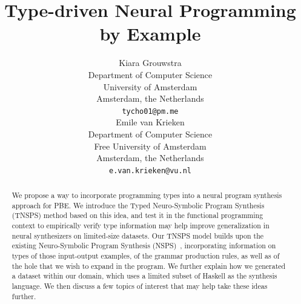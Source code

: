 \documentclass{article} %
\title{Type-driven Neural Programming by Example}
\author{
   Kiara Grouwstra
   \\
   Department of Computer Science \\
   University of Amsterdam\\
   Amsterdam, the Netherlands \\
   \texttt{tycho01@pm.me} \\
   \And
   Emile van Krieken \\
   Department of Computer Science \\
   Free University of Amsterdam\\
   Amsterdam, the Netherlands \\
   \texttt{e.van.krieken@vu.nl} \\
}
\begin{document}
% 


\maketitle






\begin{abstract}


   We propose a way to incorporate programming types into a neural program synthesis approach for PBE.
   We introduce the Typed Neuro-Symbolic Program Synthesis (TNSPS) method based on this idea,
   and test it in the functional programming context to empirically verify type information
   may help improve generalization in neural synthesizers on limited-size datasets.
   Our TNSPS model builds upon the existing Neuro-Symbolic Program Synthesis (NSPS)~\citep{nsps},
   incorporating information on types of those input-output examples,
   of the grammar production rules, as well as of the hole that we wish to expand in the program.
   We further explain how we generated a dataset within our domain,
   which uses a limited subset of Haskell as the synthesis language.
   We then discuss a few topics of interest that may help take these ideas further.

\end{abstract}
\end{document}
